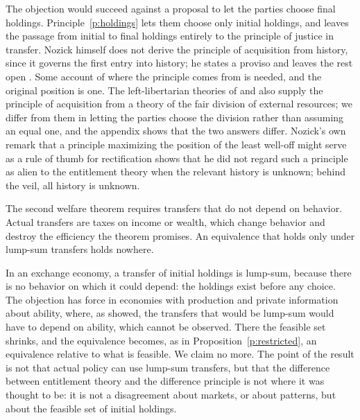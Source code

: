 \documentclass{situationist-preprint}
\begin{document}
\begin{reply}
The objection would succeed against a proposal to let the parties choose final holdings. Principle~\ref{p:holdings} lets them choose only initial holdings, and leaves the passage from initial to final holdings entirely to the principle of justice in transfer. Nozick himself does not derive the principle of acquisition from history, since it governs the first entry into history; he states a proviso and leaves the rest open \citep[ch.~7]{Nozick1974}. Some account of where the principle comes from is needed, and the original position is one. The left-libertarian theories of \citet{Steiner1994} and \citet{Otsuka2003} also supply the principle of acquisition from a theory of the fair division of external resources; we differ from them in letting the parties choose the division rather than assuming an equal one, and the appendix shows that the two answers differ. Nozick's own remark that a principle maximizing the position of the least well-off might serve as a rule of thumb for rectification shows that he did not regard such a principle as alien to the entitlement theory when the relevant history is unknown; behind the veil, all history is unknown.
\end{reply}

\begin{objection}
The second welfare theorem requires transfers that do not depend on behavior. Actual transfers are taxes on income or wealth, which change behavior and destroy the efficiency the theorem promises. An equivalence that holds only under lump-sum transfers holds nowhere.
\end{objection}

\begin{reply}
In an exchange economy, a transfer of initial holdings is lump-sum, because there is no behavior on which it could depend: the holdings exist before any choice. The objection has force in economies with production and private information about ability, where, as \citet{Mirrlees1971} showed, the transfers that would be lump-sum would have to depend on ability, which cannot be observed. There the feasible set shrinks, and the equivalence becomes, as in Proposition~\ref{p:restricted}, an equivalence relative to what is feasible. We claim no more. The point of the result is not that actual policy can use lump-sum transfers, but that the difference between entitlement theory and the difference principle is not where it was thought to be: it is not a disagreement about markets, or about patterns, but about the feasible set of initial holdings.
\end{reply}
\end{document}
